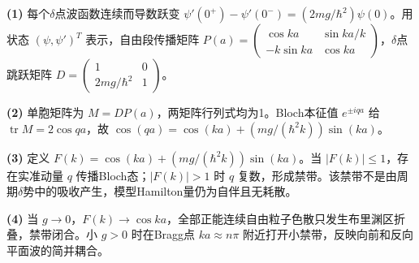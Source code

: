 \par\noindent\textbf{(1)} 每个\(\delta\)点波函数连续而导数跃变 \(\psi'(0^+)-\psi'(0^-)=(2mg/\hbar^2)\psi(0)\)。用状态 \((\psi,\psi')^T\) 表示，自由段传播矩阵 \(P(a)=\begin{pmatrix}\cos ka&\sin ka/k\\-k\sin ka&\cos ka\end{pmatrix}\)，\(\delta\)点跳跃矩阵 \(D=\begin{pmatrix}1&0\\2mg/\hbar^2&1\end{pmatrix}\)。
\par\noindent\textbf{(2)} 单胞矩阵为 \(M=DP(a)\)，两矩阵行列式均为1。Bloch本征值 \(e^{\pm iqa}\) 给 \(\operatorname{tr}M=2\cos qa\)，故 \(\cos(qa)=\cos(ka)+(mg/(\hbar^2k))\sin(ka)\)。
\par\noindent\textbf{(3)} 定义 \(F(k)=\cos(ka)+(mg/(\hbar^2k))\sin(ka)\)。当 \(|F(k)|\le1\)，存在实准动量 \(q\) 传播Bloch态；\(|F(k)|>1\) 时 \(q\) 复数，形成禁带。该禁带不是由周期\(\delta\)势中的吸收产生，模型Hamilton量仍为自伴且无耗散。
\par\noindent\textbf{(4)} 当 \(g\to0\)，\(F(k)\to\cos ka\)，全部正能连续自由粒子色散只发生布里渊区折叠，禁带闭合。小 \(g>0\) 时在Bragg点 \(ka\approx n\pi\) 附近打开小禁带，反映向前和反向平面波的简并耦合。
